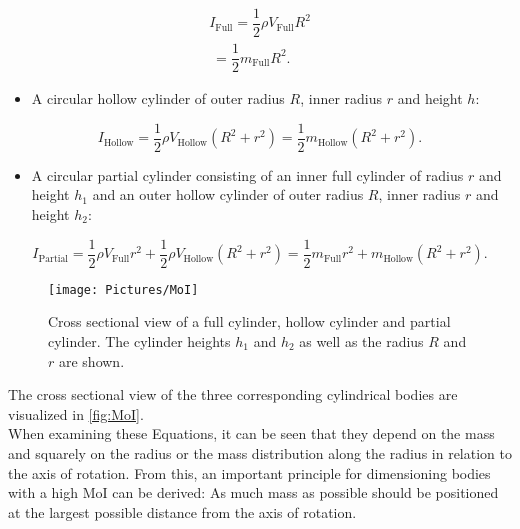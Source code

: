 \begin{equation}
\begin{split}
I_\text{Full} = \dfrac{1}{2} \rho V_\text{Full} R^{2} \\\ =  \dfrac{1}{2} m_\text{Full} R^{2} .
\end{split}
\label{eqn:MoI1}
\end{equation}

\begin{itemize}
  \setlength{\itemsep}{2pt}
\item A circular hollow cylinder of outer radius $R$, inner radius $r$ and height $h$:
\end{itemize}

\begin{equation}
I_\text{Hollow} = \dfrac{1}{2} \rho V_\text{Hollow} (R^{2} +r^{2}) = \dfrac{1}{2} m_\text{Hollow} (R^{2}+r^{2}) .
\label{eqn:MoI2}
\end{equation}

\begin{itemize}
  \setlength{\itemsep}{2pt}
\item A circular partial cylinder consisting of an inner full cylinder of radius $r$ and height $h_\text{1}$ and an outer hollow cylinder of outer radius $R$, inner radius $r$ and height $h_\text{2}$:
\end{itemize}

\begin{equation}
I_\text{Partial} = \dfrac{1}{2} \rho V_\text{Full} r^{2} + \dfrac{1}{2} \rho V_\text{Hollow} (R^{2} +r^{2}) = \dfrac{1}{2} m_\text{Full} r^{2} + m_\text{Hollow} (R^{2}+r^{2}) .
\label{eqn:MoI3}
\end{equation}

\raggedbottom

\begin{figure}[H]
{\centering
\texttt{[image: Pictures/MoI]}
\caption{Cross sectional view of a full cylinder, hollow cylinder and partial cylinder. The cylinder heights $h_\text{1}$ and $h_\text{2}$ as well as the radius $R$ and $r$ are shown.}
\label{fig:MoI}
}
\end{figure}



The cross sectional view of the three corresponding cylindrical bodies are visualized in \autoref{fig:MoI}.\\
When examining these Equations, it can be seen that they depend on the mass and squarely on the radius or the mass distribution along the radius in relation to the axis of rotation. From this, an important principle for dimensioning bodies with a high MoI can be derived: As much mass as possible should be positioned at the largest possible distance from the axis of rotation.

